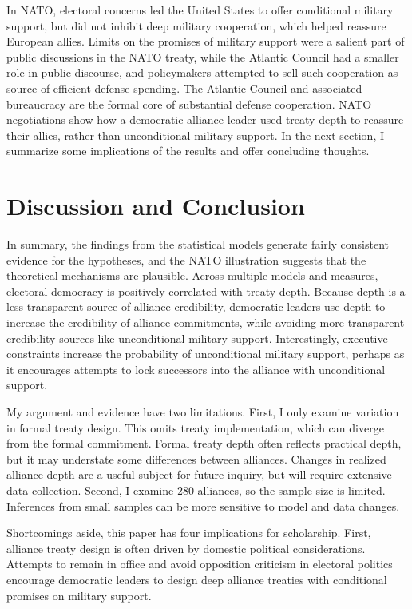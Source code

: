 \documentclass[12pt]{article}
\begin{document}
In NATO, electoral concerns led the United States to offer conditional military support, but did not inhibit deep military cooperation, which helped reassure European allies. 
Limits on the promises of military support were a salient part of public discussions in the NATO treaty, while the Atlantic Council had a smaller role in public discourse, and policymakers attempted to sell such cooperation as source of efficient defense spending. 
The Atlantic Council and associated bureaucracy are the formal core of substantial defense cooperation. 
NATO negotiations show how a democratic alliance leader used treaty depth to reassure their allies, rather than unconditional military support. 
In the next section, I summarize some implications of the results and offer concluding thoughts. 



\section{Discussion and Conclusion} 


In summary, the findings from the statistical models generate fairly consistent evidence for the hypotheses, and the NATO illustration suggests that the theoretical mechanisms are plausible. 
Across multiple models and measures, electoral democracy is positively correlated with treaty depth.  
Because depth is a less transparent source of alliance credibility, democratic leaders use depth to increase the credibility of alliance commitments, while avoiding more transparent credibility sources like unconditional military support.
Interestingly, executive constraints increase the probability of unconditional military support, perhaps as it encourages attempts to lock successors into the alliance with unconditional support. 


My argument and evidence have two limitations.
First, I only examine variation in formal treaty design. 
This omits treaty implementation, which can diverge from the formal commitment.   
Formal treaty depth often reflects practical depth, but it may understate some differences between alliances. 
Changes in realized alliance depth are a useful subject for future inquiry, but will require extensive data collection.
Second, I examine 280 alliances, so the sample size is limited. 
Inferences from small samples can be more sensitive to model and data changes. 


Shortcomings aside, this paper has four implications for scholarship. 
First, alliance treaty design is often driven by domestic political considerations. 
Attempts to remain in office and avoid opposition criticism in electoral politics encourage democratic leaders to design deep alliance treaties with conditional promises on military support. 
\end{document}

